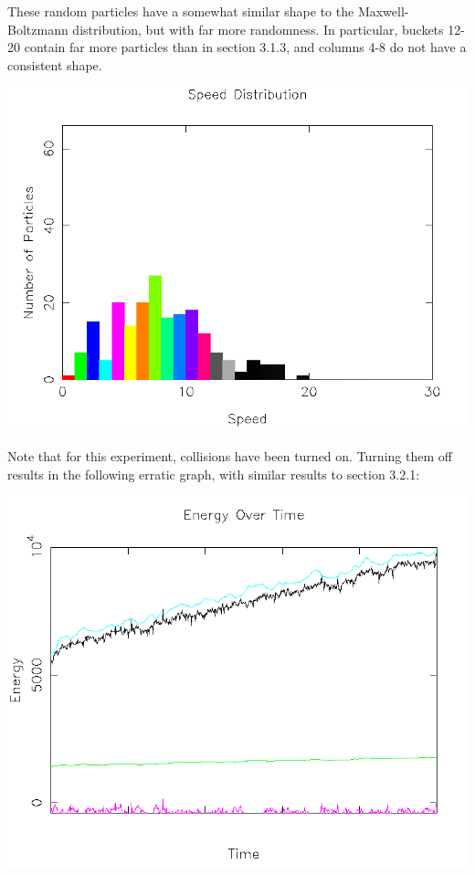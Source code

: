 \documentclass{article}
\begin{document}
These random particles have a somewhat similar shape to the Maxwell-Boltzmann distribution, but with far more randomness.
In particular, buckets 12-20 contain far more particles than in section 3.1.3, and columns 4-8 do not have a consistent shape.
\\
\begin{center}
    \includegraphics[scale=0.5]{charged_random_dist}
\end{center}


Note that for this experiment, collisions have been turned on. Turning them off results in the following erratic graph, with similar results to section 3.2.1:
\\
\begin{center}
    \includegraphics[scale=0.5]{charged_random_energy_no_collisions}
\end{center}
\end{document}
